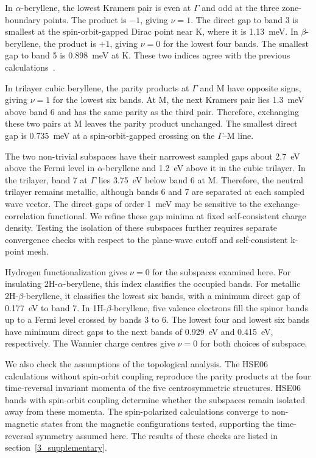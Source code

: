 In $\alpha$-beryllene, the lowest Kramers pair is even at $\Gamma$ and odd at the three zone-boundary points.
The product is $-1$, giving $\nu=1$.
The direct gap to band 3 is smallest at the spin-orbit-gapped Dirac point near $\mathrm{K}$, where it is \qty{1.13}{\milli\electronvolt}.
In $\beta$-beryllene, the product is $+1$, giving $\nu=0$ for the lowest four bands.
The smallest gap to band 5 is \qty{0.898}{\milli\electronvolt} at $\mathrm{K}$.
These two indices agree with the previous calculations~\cite{li2023coexistence}.

In trilayer cubic beryllene, the parity products at $\Gamma$ and $\mathrm{M}$ have opposite signs, giving $\nu=1$ for the lowest six bands.
At $\mathrm{M}$, the next Kramers pair lies \qty{1.3}{\milli\electronvolt} above band 6 and has the same parity as the third pair.
Therefore, exchanging these two pairs at $\mathrm{M}$ leaves the parity product unchanged.
The smallest direct gap is \qty{0.735}{\milli\electronvolt} at a spin-orbit-gapped crossing on the $\Gamma$--$\mathrm{M}$ line.

The two non-trivial subspaces have their narrowest sampled gaps about \qty{2.7}{\electronvolt} above the Fermi level in $\alpha$-beryllene and \qty{1.2}{\electronvolt} above it in the cubic trilayer.
In the trilayer, band 7 at $\Gamma$ lies \qty{3.75}{\electronvolt} below band 6 at $\mathrm{M}$.
Therefore, the neutral trilayer remains metallic, although bands 6 and 7 are separated at each sampled wave vector.
The direct gaps of order \qty{1}{\milli\electronvolt} may be sensitive to the exchange-correlation functional.
We refine these gap minima at fixed self-consistent charge density.
Testing the isolation of these subspaces further requires separate convergence checks with respect to the plane-wave cutoff and self-consistent k-point mesh.

Hydrogen functionalization gives $\nu=0$ for the subspaces examined here.
For insulating 2H-$\alpha$-beryllene, this index classifies the occupied bands.
For metallic 2H-$\beta$-beryllene, it classifies the lowest six bands, with a minimum direct gap of \qty{0.177}{\electronvolt} to band 7.
In 1H-$\beta$-beryllene, five valence electrons fill the spinor bands up to a Fermi level crossed by bands 3 to 6.
The lowest four and lowest six bands have minimum direct gaps to the next bands of \qty{0.929}{\electronvolt} and \qty{0.415}{\electronvolt}, respectively.
The Wannier charge centres give $\nu=0$ for both choices of subspace.

We also check the assumptions of the topological analysis.
The HSE06 calculations without spin-orbit coupling reproduce the parity products at the four time-reversal invariant momenta of the five centrosymmetric structures.
HSE06 bands with spin-orbit coupling determine whether the subspaces remain isolated away from these momenta.
The spin-polarized calculations converge to non-magnetic states from the magnetic configurations tested, supporting the time-reversal symmetry assumed here.
The results of these checks are listed in section~\ref{3_supplementary}.

